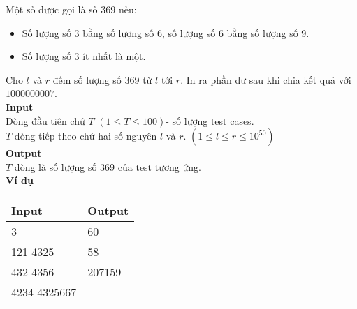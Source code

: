 Một số được gọi là số 369 nếu:
\begin{itemize}
    \item Số lượng số 3 bằng số lượng số 6, số lượng số 6 bằng số lượng số 9.
    \item Số lượng số 3 ít nhất là một.
\end{itemize}
Cho $l$ và $r$ đếm số lượng số 369 từ $l$ tới $r$. In ra phần dư sau khi chia kết quả với $1000000007$.
\\

\textbf{Input}
\\
Dòng đầu tiên chứ $T$ $(1 \leq T \leq 100)$- số lượng test cases. 
\\
$T$ dòng tiếp theo chứ hai số nguyên $l$ và $r$. $(1 \leq l \leq r \leq 10^{50})$
\\

\textbf{Output}
\\
$T$ dòng là số lượng số 369 của test tương ứng.
\\

\textbf{Ví dụ}
\begin{table}[h!]
    \begin{center}
        \begin{tabular}{|p{6cm}|p{6cm}|}
            \hline
            \textbf{Input} & \textbf{Output} \\ 
            \hline
                3 & 60 \\ 
                121 4325 & 58 \\
                432 4356 & 207159 \\
                4234 4325667 & \\
            \hline
        \end{tabular}
    \end{center}
\end{table}



